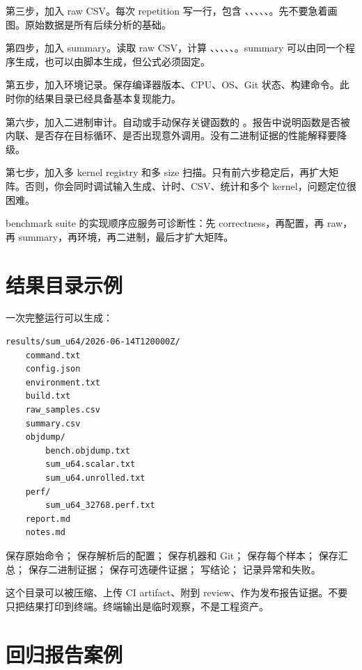第三步，加入 raw CSV。每次 repetition 写一行，包含 、、、、、。先不要急着画图。原始数据是所有后续分析的基础。

第四步，加入 summary。读取 raw CSV，计算 、、、、、。summary 可以由同一个程序生成，也可以由脚本生成，但公式必须固定。

第五步，加入环境记录。保存编译器版本、CPU、OS、Git 状态、构建命令。此时你的结果目录已经具备基本复现能力。

第六步，加入二进制审计。自动或手动保存关键函数的 。报告中说明函数是否被内联、是否存在目标循环、是否出现意外调用。没有二进制证据的性能解释要降级。

第七步，加入多 kernel registry 和多 size 扫描。只有前六步稳定后，再扩大矩阵。否则，你会同时调试输入生成、计时、CSV、统计和多个 kernel，问题定位很困难。

\begin{keyidea}
benchmark suite 的实现顺序应服务可诊断性：先 correctness，再配置，再 raw，再 summary，再环境，再二进制，最后才扩大矩阵。
\end{keyidea}

\section{结果目录示例}

一次完整运行可以生成：

\begin{lstlisting}
results/sum_u64/2026-06-14T120000Z/
    command.txt
    config.json
    environment.txt
    build.txt
    raw_samples.csv
    summary.csv
    objdump/
        bench.objdump.txt
        sum_u64.scalar.txt
        sum_u64.unrolled.txt
    perf/
        sum_u64_32768.perf.txt
    report.md
    notes.md
\end{lstlisting}

 保存原始命令； 保存解析后的配置； 保存机器和 Git； 保存每个样本； 保存汇总； 保存二进制证据； 保存可选硬件证据； 写结论； 记录异常和失败。

这个目录可以被压缩、上传 CI artifact、附到 review、作为发布报告证据。不要只把结果打印到终端。终端输出是临时观察，不是工程资产。

\section{回归报告案例}

